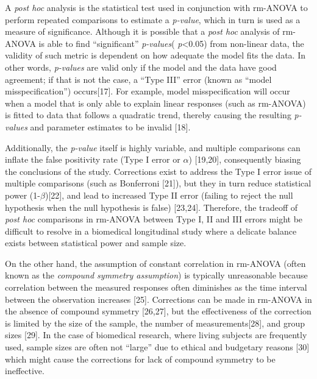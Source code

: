 \documentclass[
]{article}
\begin{document}
A \emph{post hoc} analysis is the statistical test used in conjunction with rm-ANOVA to perform repeated comparisons to estimate a \emph{p-value}, which in turn is used as a measure of significance.
Although it is possible that a \emph{post hoc} analysis of rm-ANOVA is able to find ``significant'' \emph{p-values}( \emph{p}\textless0.05) from non-linear data, the validity of such metric is dependent on how adequate the model fits the data. In other words, \emph{p-values} are valid only if the model and the data have good agreement; if that is not the case, a ``Type III'' error (known as ``model misspecification'') occurs{[}17{]}. For example, model misspecification will occur when a model that is only able to explain linear responses (such as rm-ANOVA) is fitted to data that follows a quadratic trend, thereby causing the resulting \emph{p-values} and parameter estimates to be invalid {[}18{]}.

Additionally, the \emph{p-value} itself is highly variable, and multiple comparisons can inflate the false positivity rate (Type I error or \(\alpha\)) {[}19,20{]}, consequently biasing the conclusions of the study. Corrections exist to address the Type I error issue of multiple comparisons (such as Bonferroni {[}21{]}), but they in turn reduce statistical power (1-\(\beta\)){[}22{]}, and lead to increased Type II error (failing to reject the null hypothesis when the null hypothesis is false) {[}23,24{]}. Therefore, the tradeoff of \emph{post hoc} comparisons in rm-ANOVA between Type I, II and III errors might be difficult to resolve in a biomedical longitudinal study where a delicate balance exists between statistical power and sample size.

On the other hand, the assumption of constant correlation in rm-ANOVA (often known as the \emph{compound symmetry assumption}) is typically unreasonable because correlation between the measured responses often diminishes as the time interval between the observation increases {[}25{]}. Corrections can be made in rm-ANOVA in the absence of compound symmetry {[}26,27{]}, but the effectiveness of the correction is limited by the size of the sample, the number of measurements{[}28{]}, and group sizes {[}29{]}. In the case of biomedical research, where living subjects are frequently used, sample sizes are often not ``large'' due to ethical and budgetary reasons {[}30{]} which might cause the corrections for lack of compound symmetry to be ineffective.
\end{document}
